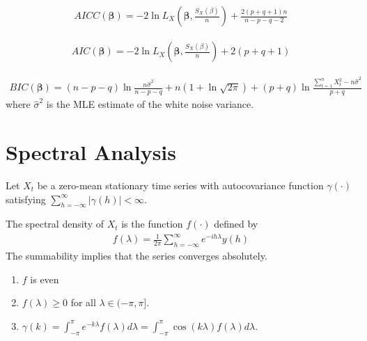 \begin{thm}
  \label{defn:estimation_arma:12}
  \begin{align}
    \label{eq:68}
    AICC(\mathbf{\beta}) = -2 \ln L_{X}(\mathbf{\beta},
    \frac{S_{X}(\beta)}{n}) + \frac{2(p+q+1)n}{n - p - q - 2}
  \end{align}
\end{thm}

\begin{thm}
  \label{defn:estimation_arma:13}
  \begin{align}
    \label{eq:69}
    AIC(\mathbf{\beta}) = -2 \ln L_{X}(\mathbf{\beta}, \frac{S_{X}(\beta)}{n}) + 2(p + q + 1)
  \end{align}
\end{thm}

\begin{thm}
  \label{defn:estimation_arma:13}
  \begin{align}
    \label{eq:69}
    BIC(\mathbf{\beta}) = (n - p - q) \ln \frac{n \hat
      \sigma^{2}}{n-p-q} + n(1 + \ln \sqrt{2 \pi}) + (p + q) \ln
    \frac{\sum_{t=1}^{n} X_{t}^{2} - n \hat \sigma^{2}}{p + q}
  \end{align}
  where $\hat \sigma^{2}$ is the MLE estimate of the white noise
  variance.
\end{thm}

\section{Spectral Analysis}
\label{sec:spectral-analysis}

Let $X_{t}$ be a zero-mean stationary time series with autocovariance
function $\gamma(\cdot)$ satisfying $\sum_{h=-\infty}^{\infty}
|\gamma(h)| < \infty$.

\begin{defn}
  \label{defn:spectral_analysis:1}
  The spectral density of $X_{t}$ is the function $f(\cdot)$ defined
  by
  \begin{align}
    \label{eq:47}
    f(\lambda) = \frac{1}{2 \pi} \sum_{h=-\infty}^{\infty}
    e^{-ih\lambda} y(h)
  \end{align}  The summability implies that the series converges
  absolutely.
\end{defn}

\begin{thm}
  \label{defn:spectral_analysis:2}
  \begin{enumerate}
  \item $f$ is even
  \item $f(\lambda) \geq 0$ for all $\lambda \in (-\pi, \pi]$.
  \item $\gamma(k) = \int_{-\pi}^{\pi} e^{-k\lambda} f(\lambda) d
    \lambda = \int_{-\pi}^{\pi} \cos (k \lambda) f(\lambda) d\lambda$.
  \end{enumerate}
\end{thm}

